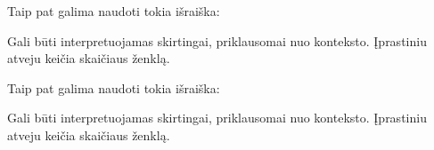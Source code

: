 \documentclass[letterpaper,10pt,lithuanian]{sphinxmanual}
\begin{document}

\begin{fulllineitems}
\label{\detokenize{formules:positive}}
\pysigstartsignatures
\pysiglinewithargsret
{}
{}
{}
\pysigstopsignatures
\sphinxAtStartPar
Taip pat galima naudoti tokia išraiška:

\begin{sphinxVerbatim}[commandchars=\\\{\}]
\end{sphinxVerbatim}

\sphinxAtStartPar
Gali būti interpretuojamas skirtingai, priklausomai nuo konteksto.
Įprastiniu atveju keičia skaičiaus ženklą.

\end{fulllineitems}


\begin{fulllineitems}
\label{\detokenize{formules:negative}}
\pysigstartsignatures
\pysiglinewithargsret
{}
{}
{}
\pysigstopsignatures
\sphinxAtStartPar
Taip pat galima naudoti tokia išraiška:

\begin{sphinxVerbatim}[commandchars=\\\{\}]
\end{sphinxVerbatim}

\sphinxAtStartPar
Gali būti interpretuojamas skirtingai, priklausomai nuo konteksto.
Įprastiniu atveju keičia skaičiaus ženklą.

\end{fulllineitems}

\end{document}
